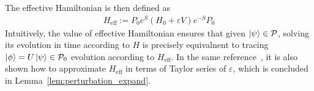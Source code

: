 



The effective Hamiltonian is then defined as
\begin{align}
    H_{\mathrm{eff}} := P_0 e^{S}(H_0 + \varepsilon V) e^{-S} P_0
\end{align}
Intuitively, the value of effective Hamiltonian ensures that given $\ket{\psi} \in \mathcal{P}$, solving its evolution in time according to $H$
is precisely equivalnent to tracing $\ket{\phi} =U\ket{\psi} \in \mathcal{P}_0$ evolution according to  $H_{\mathrm{eff}}$.
In the same reference~\cite{bravyi2011schrieffer}, it is also shown how to approximate $H_{\mathrm{eff}}$ in terms of Taylor series of $\varepsilon$, which is concluded in Lemma~\ref{lem:perturbation_expand}.

